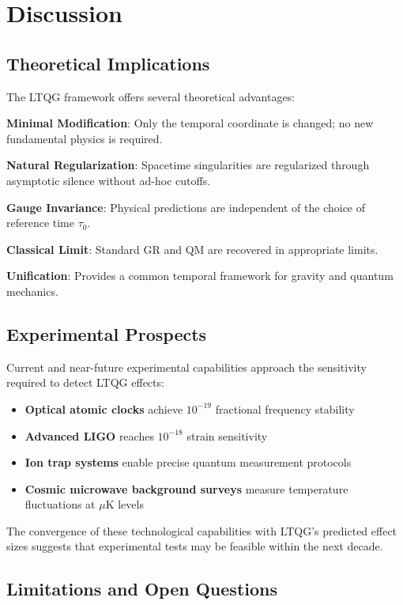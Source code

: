 \documentclass[12pt,a4paper]{article}
\begin{document}
\section{Discussion}

\subsection{Theoretical Implications}

The LTQG framework offers several theoretical advantages:

\textbf{Minimal Modification}: Only the temporal coordinate is changed; no new fundamental physics is required.

\textbf{Natural Regularization}: Spacetime singularities are regularized through asymptotic silence without ad-hoc cutoffs.

\textbf{Gauge Invariance}: Physical predictions are independent of the choice of reference time $\tau_0$.

\textbf{Classical Limit}: Standard GR and QM are recovered in appropriate limits.

\textbf{Unification}: Provides a common temporal framework for gravity and quantum mechanics.

\subsection{Experimental Prospects}

Current and near-future experimental capabilities approach the sensitivity required to detect LTQG effects:

\begin{itemize}
\item \textbf{Optical atomic clocks} achieve $10^{-19}$ fractional frequency stability
\item \textbf{Advanced LIGO} reaches $10^{-18}$ strain sensitivity  
\item \textbf{Ion trap systems} enable precise quantum measurement protocols
\item \textbf{Cosmic microwave background surveys} measure temperature fluctuations at $\mu$K levels
\end{itemize}

The convergence of these technological capabilities with LTQG's predicted effect sizes suggests that experimental tests may be feasible within the next decade.

\subsection{Limitations and Open Questions}
\end{document}
